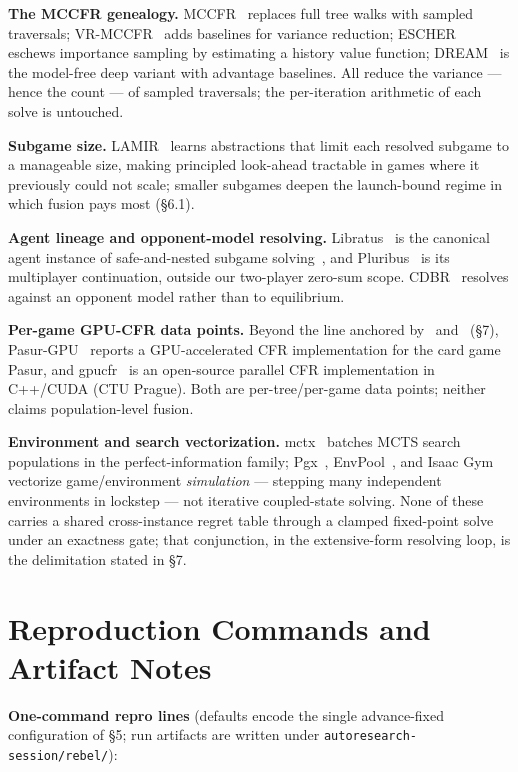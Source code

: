 \documentclass[11pt]{article}
\begin{document}
\textbf{The MCCFR genealogy.} MCCFR~\citep{Lanctot2009} replaces full tree walks with
sampled traversals; VR-MCCFR~\citep{Schmid2019} adds baselines for variance reduction;
ESCHER~\citep{McAleer2023} eschews importance sampling by estimating a history value
function; DREAM~\citep{Steinberger2020} is the model-free deep variant with advantage
baselines. All reduce the variance --- hence the count --- of sampled traversals; the
per-iteration arithmetic of each solve is untouched.

\textbf{Subgame size.} LAMIR~\citep{LAMIR} learns abstractions that limit each resolved
subgame to a manageable size, making principled look-ahead tractable in games where it
previously could not scale; smaller subgames deepen the launch-bound regime in which
fusion pays most (\S6.1).

\textbf{Agent lineage and opponent-model resolving.}
Libratus~\citep{BrownSandholm2017Libratus} is the canonical agent instance of
safe-and-nested subgame solving~\citep{BrownSandholm2017}, and
Pluribus~\citep{BrownSandholm2019Pluribus} is its multiplayer continuation, outside our
two-player zero-sum scope. CDBR~\citep{CDBR} resolves against an opponent model rather
than to equilibrium.

\textbf{Per-game GPU-CFR data points.} Beyond the line anchored by~\citep{Kim2024}
and~\citep{KimSandholm2026} (\S7), Pasur-GPU~\citep{Pasur-GPU} reports a GPU-accelerated
CFR implementation for the card game Pasur, and gpucfr~\citep{gpucfr} is an open-source
parallel CFR implementation in C++/CUDA (CTU Prague). Both are per-tree/per-game data
points; neither claims population-level fusion.

\textbf{Environment and search vectorization.} mctx~\citep{Danihelka2022} batches MCTS
search populations in the perfect-information family; Pgx~\citep{Koyamada2023},
EnvPool~\citep{Weng2022}, and Isaac Gym~\citep{Makoviychuk2021} vectorize
game/environment \emph{simulation} --- stepping many independent environments in
lockstep --- not iterative coupled-state solving. None of these carries a shared
cross-instance regret table through a clamped fixed-point solve under an exactness gate;
that conjunction, in the extensive-form resolving loop, is the delimitation stated in
\S7.

\section{Reproduction Commands and Artifact Notes}

\textbf{One-command repro lines} (defaults encode the single advance-fixed configuration
of \S5; run artifacts are written under \texttt{autoresearch-session/rebel/}):
\end{document}
